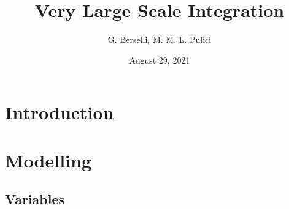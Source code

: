 \documentclass[a4paper, 12pt]{article}
\begin{document}
\title{Very Large Scale Integration}
\author{G. Berselli, M. M. L. Pulici}
\date{August 29, 2021}
\maketitle
\begin{center}
\end{center}


\clearpage

\tableofcontents

\clearpage

\listoffigures

\clearpage


\section{Introduction}

\clearpage
\section{Modelling}\label{sec:modelling}


\subsection{Variables}
\end{document}
